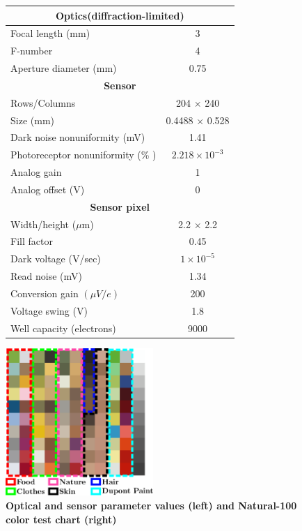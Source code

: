 \documentclass[]{spie}
\begin{document}
\begin{figure}[t]
 \begin{center}
\begin{minipage}{0.45\textwidth}
\begin{flushright}
 \begin{scriptsize}
\begin{tabular}{|l|c|}
\hline 
\multicolumn{2}{|c|}{\small\textbf{Optics(diffraction-limited)}} \\\hline 
Focal length (mm) & 3 \\ 
F-number & 4 \\ 
Aperture diameter (mm) & 0.75 \\ \hline 
\multicolumn{2}{|c|}{\small\textbf{Sensor}} \\ \hline 
Rows/Columns & 204 $\times$ 240 \\ 
Size (mm) & 0.4488 $\times$ 0.528 \\ 
Dark noise nonuniformity (mV) & 1.41 \\ 
Photoreceptor nonuniformity (\% ) & $2.218 \times 10 ^{-3}$ \\ 
Analog gain & 1 \\ 
Analog offset (V) & 0 \\\hline 
\multicolumn{2}{|c|}{\small\textbf{Sensor pixel }} \\ \hline 
Width/height ($\mu$m) & 2.2 $\times$ 2.2\\ 
Fill factor & 0.45 \\
Dark voltage (V/sec) & $1 \times 10^{-5}$ \\ 
Read noise (mV) & 1.34 \\ 
Conversion gain $(\mu V/e)$ & 200 \\ 
Voltage swing (V) & 1.8 \\ 
Well capacity (electrons) & 9000 \\ \hline 
\end{tabular} 
\end{scriptsize}
\end{flushright}
\end{minipage}\hfill
\begin{minipage}{0.45\textwidth}
\begin{flushleft}
 \includegraphics[height=5.6cm]{Fig2/chart}
\end{flushleft}
\end{minipage}
\end{center}
\caption{\textbf{Optical and sensor parameter values (left) and Natural-100 color test chart (right)}}
\label{fig:natureBasedChart}
\end{figure}
\end{document}
